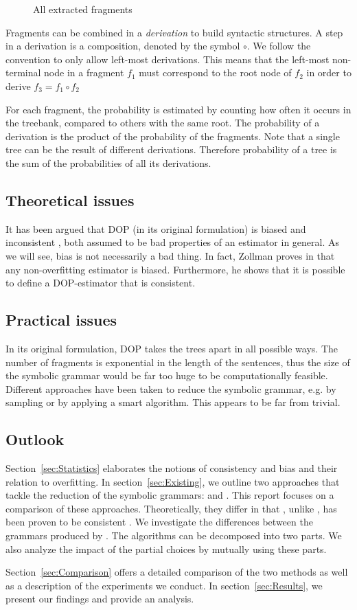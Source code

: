 \begin{figure}[h!]
\center 
\caption{All extracted fragments}
\label{f:fragments}
\end{figure}


Fragments can be combined in a \emph{derivation} to build syntactic structures. A step in a derivation is a composition, denoted by the symbol $\circ$. We follow the convention to only allow left-most derivations. This means that the left-most non-terminal node in a fragment $f_1$ must correspond to the root node of $f_2$ in order to derive $f_3=f_1\circ f_2$

For each fragment, the probability is estimated by counting how often it occurs in the treebank, compared to others with the same root. The probability of a derivation is the product of the probability of the fragments. Note that a single tree can be the result of different derivations. Therefore probability of a tree is the sum of the probabilities of all its derivations.

\subsection{Theoretical issues}
It has been argued that DOP (in its original formulation) is biased and inconsistent \cite{johnson2002}, both assumed to be bad properties of an estimator in general. As we will see, bias is not necessarily a bad thing. In fact, Zollman proves in  \cite{zollmann2005} that any non-overfitting estimator is biased. Furthermore, he shows that it is possible to define a DOP-estimator that is consistent.


\subsection{Practical issues}
In its original formulation, DOP takes the trees apart in all possible ways. The number of fragments is exponential in the length of the sentences, thus the size of the symbolic grammar would be far too huge to be computationally feasible. 
Different approaches have been taken to reduce the symbolic grammar, e.g. by sampling or by applying a smart algorithm. This appears to be far from trivial.


\subsection{Outlook}
Section~\ref{sec:Statistics} elaborates the notions of consistency and bias and their relation to overfitting.
In section~\ref{sec:Existing}, we outline two approaches that tackle the reduction of the symbolic grammars: \ddop{} and \dops{}. This report focuses on a comparison of these approaches. Theoretically, they differ in that \dops{}, unlike \ddop{}, has been proven to be consistent \cite{zollmann2005}. We investigate the differences between the grammars produced by \ddop{} \dops{}. The algorithms can be decomposed into two parts. We also analyze the impact of the partial choices by mutually using these parts.

Section~\ref{sec:Comparison} offers a detailed comparison of the two methods as well as a description of the experiments we conduct. In section~\ref{sec:Results}, we present our findings and provide an analysis. 


